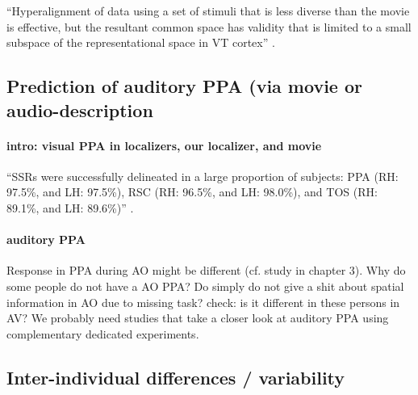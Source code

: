 %
``Hyperalignment of data using a set of stimuli that is less diverse than the
movie is effective, but the resultant common space has validity that is limited
to a small subspace of the representational space in VT cortex''
\citep{haxby2011common}.


\subsection{Prediction of auditory PPA (via movie or audio-description}

\paragraph{intro: visual PPA in localizers, our localizer, and movie}

``SSRs were successfully delineated in a large proportion of subjects: PPA (RH:
97.5\%, and LH: 97.5\%), RSC (RH: 96.5\%, and LH: 98.0\%), and TOS (RH: 89.1\%,
and LH: 89.6\%)'' \citep{zhen2017quantifying}.



\paragraph{auditory PPA}



Response in PPA during AO might be different (cf. study in chapter 3).
%
Why do some people do not have a AO PPA? Do simply do not give a shit
about spatial information in AO due to missing task?
%
check: is it different in these persons in AV?
%
We probably need studies that take a closer look at auditory PPA using
complementary dedicated experiments.


\subsection{Inter-individual differences / variability}

